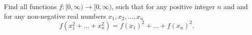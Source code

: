Find all functions $f:[0, \infty) \to [0,\infty)$,  such that for any positive integer $n$ and and for any non-negative real numbers $x_1,x_2,\dotsc,x_n$\[f(x_1^2+\dotsc+x_n^2)=f(x_1)^2+\dots+f(x_n)^2.\]